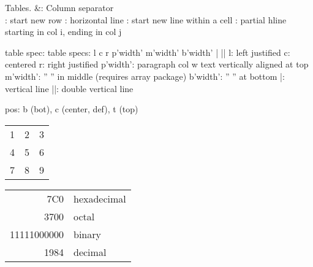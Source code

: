 






Tables.
&: Column separator
\\: start new row
\hline: horizontal line
\newline: start new line within a cell
: partial hline starting in col i, ending in col j

\begin{tabular}[pos]{table spec}:
  table specs: l c r p{'width'} m{'width'} b{'width'} | ||
  l: left justified
  c: centered
  r: right justified
  p{'width'}: paragraph col w text vertically aligned at top
  m{'width'}: '' '' in middle (requires array package)
  b{'width'}: '' '' at bottom
  |: vertical line
  ||: double vertical line

\end{tabular}

pos: b (bot), c (center, def), t (top)


\begin{tabular}{ l c r }
  1 & 2 & 3 \\  
  4 & 5 & 6 \\  
  7 & 8 & 9 \\  
\end{tabular}


\begin{tabular}{|r|l|}
  \hline
  7C0 & hexadecimal \\  
  3700 & octal \\   \cline{2-2}
  11111000000 & binary \\  
  \hline \hline
  1984 & decimal \\  
  \hline
\end{tabular}
